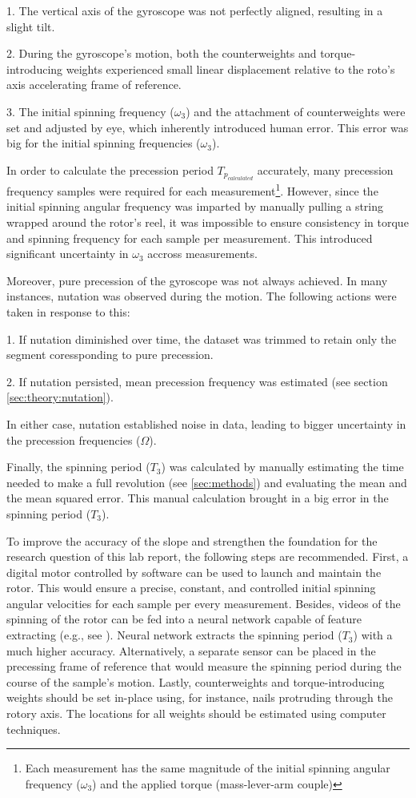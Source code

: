 \begin{multicols}{2}
1. The vertical axis of the gyroscope was not perfectly aligned, resulting in a slight tilt.

2. During the gyroscope's motion, both the counterweights and torque-introducing weights experienced small linear displacement relative to the roto's axis accelerating frame of reference.

3. The initial spinning frequency ($\omega_{3}$) and the attachment of counterweights were set and adjusted by eye, which inherently introduced human error. This error was big for the initial spinning frequencies ($\omega_{3}$).

In order to calculate the precession period $T_{p_{calculated}}$ accurately, many precession frequency samples were required for each measurement\footnote{Each measurement has the same magnitude of the initial spinning angular frequency ($\omega_{3}$) and the applied torque (mass-lever-arm couple)}. However, since the initial spinning angular frequency was imparted by manually pulling a string wrapped around the rotor's reel, it was impossible to ensure consistency in torque and spinning frequency for each sample per measurement. This introduced significant uncertainty in $\omega_{3}$ accross measurements.

Moreover, pure precession of the gyroscope was not always achieved. In many instances, nutation was observed during the motion. The following actions were taken in response to this:

1. If nutation diminished over time, the dataset was trimmed to retain only the segment coressponding to pure precession.

2. If nutation persisted, mean precession frequency was estimated (see section \ref{sec:theory:nutation}).

In either case, nutation established noise in data, leading to bigger uncertainty in the precession frequencies ($\Omega$).

Finally, the spinning period ($T_{3}$) was calculated by manually estimating the time needed to make a full revolution (see \ref{sec:methods}) and evaluating the mean and the mean squared error. This manual calculation brought in a big error in the spinning period ($T_{3}$).

To improve the accuracy of the slope and strengthen the foundation for the research question of this lab report, the following steps are recommended. First, a digital motor controlled by software can be used to launch and maintain the rotor. This would ensure a precise, constant, and controlled initial spinning angular velocities for each sample per every measurement. Besides, videos of the spinning of the rotor can be fed into a neural network capable of feature extracting (e.g., see \cite{nn}). Neural network extracts the spinning period ($T_{3}$) with a much higher accuracy. Alternatively, a separate sensor can be placed in the precessing frame of reference that would measure the spinning period during the course of the sample's motion. Lastly, counterweights and torque-introducing weights should be set in-place using, for instance, nails protruding through the rotory axis. The locations for all weights should be estimated using computer techniques.   
\end{multicols}
